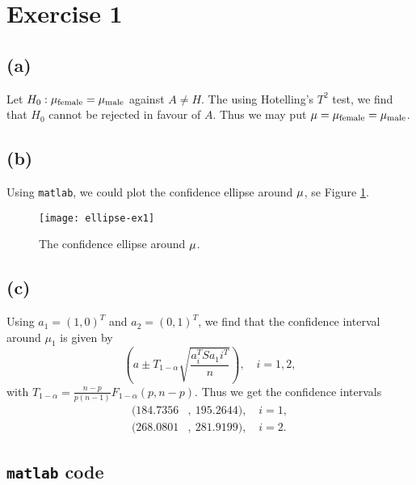 
\section*{Exercise 1}

\subsection*{(a)}
\label{sec:a}

Let $H_0: \mu_{\rm female}= \mu_{\rm male}$ against $A \neq H$. The
using Hotelling's $T^2$ test, we find that $H_0$ cannot be rejected in
favour of $A$. Thus we may put $\mu = \mu_{\rm female} = \mu_{\rm male}$.

\subsection*{(b)}
\label{sec:b}

Using \texttt{matlab}, we could plot the confidence ellipse around
${\bf \mu}$, se Figure \ref{fig:ex1-ellipse}.
\begin{figure}[h]
  \centering
  \texttt{[image: ellipse-ex1]}
  \caption{The confidence ellipse around ${\bf \mu}$.}
  \label{fig:ex1-ellipse}
\end{figure}

\subsection*{(c)}
\label{sec:c}

Using $a_1 = (1,0)^T$ and $a_2 = (0,1)^T$, we find that the confidence
interval around $\mu_1$ is given by
\begin{equation*}
  \left(
    a \pm T_{1-\alpha} \sqrt{\frac{a_i^T S a_1i^T}{n}}
  \right), \quad i = 1,2,
\end{equation*}
with $T_{1-\alpha} = \frac{n-p}{p(n-1)}F_{1-\alpha}(p, n-p)$. Thus we
get the confidence intervals
\begin{align*}
  (184.7356&,\ 195.2644),\quad i = 1, \\
  (268.0801&,\ 281.9199),\quad i = 2.
\end{align*}

\subsection*{\texttt{matlab} code}


